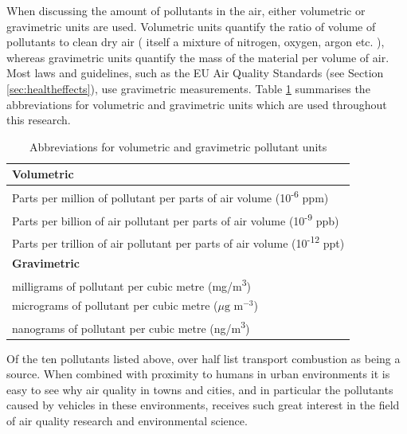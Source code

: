 When discussing the amount of pollutants in the air, either volumetric or gravimetric units are used. Volumetric units quantify the ratio of volume of pollutants to clean dry air ( itself a mixture of nitrogen, oxygen, argon etc. ), whereas gravimetric units  quantify the mass of the material per volume of air. Most laws and guidelines, such as the EU Air Quality Standards (see Section \ref{sec:healtheffects}), use gravimetric measurements. Table \ref{tab:pollution_units} summarises the abbreviations for volumetric and gravimetric units which are used throughout this research.

\begin{table}[H]
\centering
    \begin{tabular}{ | l |}
    \hline 
     \textbf{Volumetric} \\ \hline
      Parts per million of pollutant per parts of air volume (10\textsuperscript{-6} ppm) \\ \hline
     Parts per billion of air pollutant per parts of air volume (10\textsuperscript{-9} ppb) \\ \hline
     Parts per trillion of air pollutant per parts of air volume (10\textsuperscript{-12} ppt) \\ \hline
     \textbf{Gravimetric} \\ \hline
     milligrams of pollutant per cubic metre (mg/m\textsuperscript{3}) \\ \hline
     micrograms of pollutant per cubic metre ($\mu \text{g m}^{-3}$) \\ \hline
     nanograms of pollutant per cubic metre (ng/m\textsuperscript{3}) \\ \hline
    \end{tabular}
\caption{Abbreviations for volumetric and gravimetric pollutant units}
\label{tab:pollution_units}
\end{table}
 
Of the ten pollutants listed above, over half list transport combustion as being a source. When combined with proximity to humans in urban environments it is easy to see why air quality in towns and cities, and in particular the pollutants caused by vehicles in these environments, receives such great interest in the field of air quality research and environmental science.


